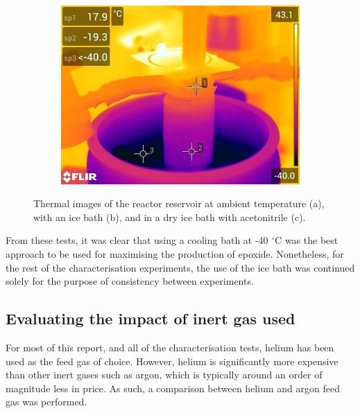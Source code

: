 \begin{figure}
\begin{subfigure}[b]{0.475\textwidth}
        \caption{}
        \label{fig:thermal_ice_bath}
    \end{subfigure}
    \\
    \vfill
     \begin{subfigure}[b]{0.475\textwidth}  
        \centering 
        \includegraphics[width=\textwidth]{chapter_6/figures/thermal_dry_ice.jpg}
        \caption{}
        \label{fig:thermal_dry_ice}
    \end{subfigure}

    \caption{\small Thermal images of the reactor reservoir at ambient temperature (a), with an ice bath (b), and in a dry ice bath with acetonitrile (c).} 
    \label{fig:thermal_images}
\end{figure}

From these tests, it was clear that using a cooling bath at -40 $^{\circ}$C was the best approach to be used for maximising the production of epoxide. Nonetheless, for the rest of the characterisation experiments, the use of the ice bath was continued solely for the purpose of consistency between experiments.

\subsection{Evaluating the impact of inert gas used}

For most of this report, and all of the characterisation tests, helium has been used as the feed gas of choice. However, helium is significantly more expensive than other inert gases such as argon, which is typically around an order of magnitude less in price. As such, a comparison between helium and argon feed gas was performed.

